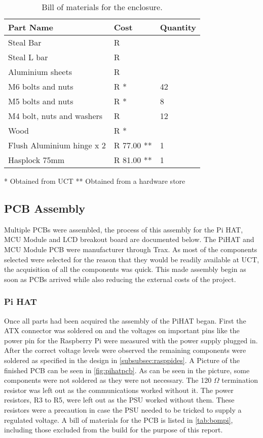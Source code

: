 \documentclass[a4paper,11pt]{article}
\numberwithin{figure}{section}
\numberwithin{table}{section}
\begin{document}
	\begin{table}[ht]
	\centering		
	\begin{tabular}{| m{8cm} | m{4cm}| m{3cm} |}
	\hline
	\textbf{Part Name} & \textbf{Cost} & \textbf{Quantity} \\
	\hline
	Steal Bar & R & \\
	\hline
	Steal L bar & R & \\
	\hline	
	Aluminium sheets & R & \\
	\hline	
	M6 bolts and nuts & R * & 42 \\
	\hline
	M5 bolts and nuts & R * & 8 \\
	\hline
	M4 bolt, nuts and washers & R & 12\\	
	\hline
	Wood & R * & \\
	\hline	
	Flush Aluminium hinge x 2 & R 77.00 ** & 1 \\
	\hline
	Hasplock 75mm & R 81.00 ** & 1 \\
	\hline
	\end{tabular}
	
	 * Obtained from UCT
	 ** Obtained from a hardware store
	\caption{Bill of materials for the enclosure. \label{tab:bomen}}
	\end{table}	

\subsection{PCB Assembly}
Multiple PCBs were assembled, the process of this assembly for the Pi HAT, MCU Module and LCD breakout board are documented below. The PiHAT and MCU Module PCB were manufacturer through Trax. As most of the components selected were selected for the reason that they would be readily available at UCT, the acquisition of all the components was quick. This made assembly begin as soon as PCBs arrived while also reducing the external costs of the project.

\subsubsection{Pi HAT}

Once all parts had been acquired the assembly of the PiHAT began. First the ATX connector was soldered on and the voltages on important pins like the power pin for the Raspberry Pi were measured with the power supply plugged in. After the correct voltage levels were observed the remaining components were soldered as specified in the design in \autoref{subsubsec:rasppides}. A Picture of the finished PCB can be seen in \autoref{fig:pihatpcb}. As can be seen in the picture, some components were not soldered as they were not necessary. The 120 $\Omega$ termination resistor was left out as the communications worked without it. The power resistors, R3 to R5, were left out as the PSU worked without them. These resistors were a precaution in case the PSU needed to be tricked to supply a regulated voltage. A bill of materials for the PCB is listed in \autoref{tab:bompi}, including those excluded from the build for the purpose of this report.
	
\end{document}
